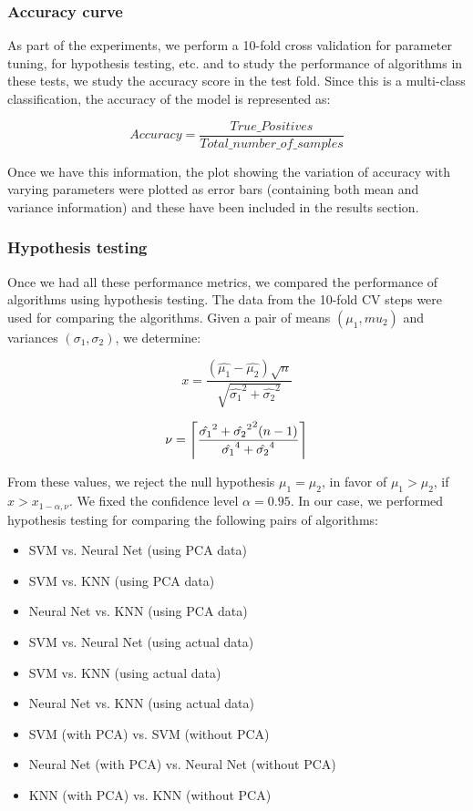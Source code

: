 \documentclass[10pt]{scrartcl}
\DeclarePairedDelimiter{\ceil}{\lceil}{\rceil}
\begin{document}
\subsubsection*{Accuracy curve}
As part of the experiments, we perform a 10-fold cross validation for parameter tuning, for hypothesis testing, etc. and to study the performance of algorithms in these tests, we study the accuracy score in the test fold. Since this is a multi-class classification, the accuracy of the model is represented as:

\begin{equation*}
Accuracy = \frac{True\_Positives}{Total\_number\_of\_samples}
\end{equation*}

Once we have this information, the plot showing the variation of accuracy with varying parameters were plotted as error bars (containing both mean and variance information) and these have been included in the results section.

\subsubsection*{Hypothesis testing}
Once we had all these performance metrics, we compared the performance of algorithms using hypothesis testing. The data from the 10-fold CV steps were used for comparing the algorithms. Given a pair of means $(\mu_{1}, mu_{2})$ and variances $(\sigma_1,\sigma_2)$, we determine:

\begin{equation*}
x = \frac{(\hat{\mu_1} - \hat{\mu_2})\sqrt{n}}{\sqrt{\hat{\sigma_1}^{2} + \hat{\sigma_2}^{2}}}
\end{equation*}

\begin{equation*}
\nu = \ceil*{\frac{{\hat{\sigma_1}^{2} + \hat{\sigma_2}^{2}}^{2}(n-1)}{\hat{\sigma_1}^{4} + \hat{\sigma_2}^{4}}}
\end{equation*}

From these values, we reject the null hypothesis $\mu_1 = \mu_2$, in favor of $\mu_1 > \mu_2$, if $x > x_{1-\alpha, \nu}$. We fixed the confidence level $\alpha = 0.95$. In our case, we performed hypothesis testing for comparing the following pairs of algorithms:

\begin{itemize}
\item SVM vs. Neural Net (using PCA data)
\item SVM vs. KNN (using PCA data)
\item Neural Net vs. KNN (using PCA data)
\item SVM vs. Neural Net (using actual data)
\item SVM vs. KNN (using actual data)
\item Neural Net vs. KNN (using actual data)
\item SVM (with PCA) vs. SVM (without PCA)
\item Neural Net (with PCA) vs. Neural Net (without PCA)
\item KNN (with PCA) vs. KNN (without PCA)
\end{itemize}
\end{document}

